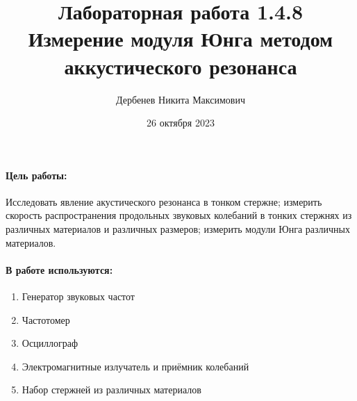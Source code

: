 \documentclass[a4paper, 10pt]{article}%
\author{Дербенев Никита Максимович}
\title{Лабораторная работа 1.4.8\\
	Измерение модуля Юнга методом аккустического резонанса}
\date{26 октября 2023}
\begin{document}
	\maketitle
	\paragraph {Цель работы:}
		Исследовать явление акустического резонанса в тонком стержне; измерить скорость распространения продольных звуковых колебаний в тонких стержнях из различных материалов и различных размеров; измерить модули Юнга различных материалов.
	\paragraph{В работе используются:}
	\begin{enumerate}
		\item Генератор звуковых частот
		\item Частотомер
		\item Осциллограф
		\item Электромагнитные излучатель и приёмник колебаний
		\item Набор стержней из различных материалов
	\end{enumerate}
\end{document}
